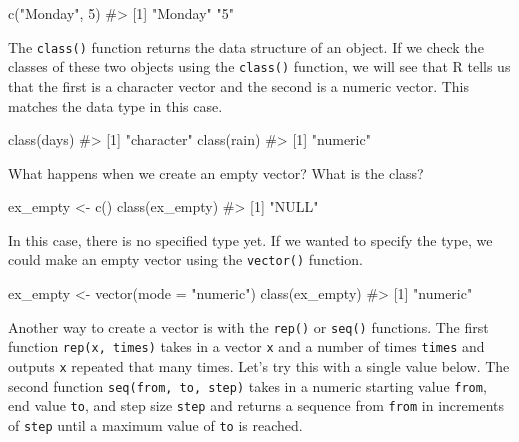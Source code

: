 \documentclass[
  letterpaper,
]{krantz}
\makeatletter
\newenvironment{Shaded}{\begin{snugshade}}{\end{snugshade}}
\newcommand{\AttributeTok}[1]{\textcolor[rgb]{0.40,0.45,0.13}{#1}}
\newcommand{\CommentTok}[1]{\textcolor[rgb]{0.37,0.37,0.37}{#1}}
\newcommand{\DecValTok}[1]{\textcolor[rgb]{0.68,0.00,0.00}{#1}}
\newcommand{\FunctionTok}[1]{\textcolor[rgb]{0.28,0.35,0.67}{#1}}
\newcommand{\NormalTok}[1]{\textcolor[rgb]{0.00,0.23,0.31}{#1}}
\newcommand{\OtherTok}[1]{\textcolor[rgb]{0.00,0.23,0.31}{#1}}
\newcommand{\StringTok}[1]{\textcolor[rgb]{0.13,0.47,0.30}{#1}}
\newenvironment{kframe}{%
\medskip{}
\setlength{\fboxsep}{.8em}
 \def\at@end@of@kframe{}%
 \ifinner\ifhmode%
  \def\at@end@of@kframe{\end{minipage}}%
  \begin{minipage}{\columnwidth}%
 \fi\fi%
 \def\FrameCommand##1{\hskip\@totalleftmargin \hskip-\fboxsep
 \colorbox{shadecolor}{##1}\hskip-\fboxsep
     \hskip-\linewidth \hskip-\@totalleftmargin \hskip\columnwidth}%
 \MakeFramed {\advance\hsize-\width
   \@totalleftmargin\z@ \linewidth\hsize
   \@setminipage}}%
 {\par\unskip\endMakeFramed%
 \at@end@of@kframe}
\renewenvironment{Shaded}{\begin{kframe}}{\end{kframe}}
\makeatother
\begin{document}
\begin{Shaded}
\begin{Highlighting}[]
\FunctionTok{c}\NormalTok{(}\StringTok{"Monday"}\NormalTok{, }\DecValTok{5}\NormalTok{)}
\CommentTok{\#\textgreater{} [1] "Monday" "5"}
\end{Highlighting}
\end{Shaded}

The \texttt{class()} function returns the data structure of an object.
If we check the classes of these two objects using the \texttt{class()}
function, we will see that R tells us that the first is a character
vector and the second is a numeric vector. This matches the data type in
this case.

\begin{Shaded}
\begin{Highlighting}[]
\FunctionTok{class}\NormalTok{(days)}
\CommentTok{\#\textgreater{} [1] "character"}
\FunctionTok{class}\NormalTok{(rain)}
\CommentTok{\#\textgreater{} [1] "numeric"}
\end{Highlighting}
\end{Shaded}

What happens when we create an empty vector? What is the class?

\begin{Shaded}
\begin{Highlighting}[]
\NormalTok{ex\_empty }\OtherTok{\textless{}{-}} \FunctionTok{c}\NormalTok{()}
\FunctionTok{class}\NormalTok{(ex\_empty)}
\CommentTok{\#\textgreater{} [1] "NULL"}
\end{Highlighting}
\end{Shaded}

In this case, there is no specified type yet. If we wanted to specify
the type, we could make an empty vector using the \texttt{vector()}
function.

\begin{Shaded}
\begin{Highlighting}[]
\NormalTok{ex\_empty }\OtherTok{\textless{}{-}} \FunctionTok{vector}\NormalTok{(}\AttributeTok{mode =} \StringTok{"numeric"}\NormalTok{)}
\FunctionTok{class}\NormalTok{(ex\_empty)}
\CommentTok{\#\textgreater{} [1] "numeric"}
\end{Highlighting}
\end{Shaded}

Another way to create a vector is with the \texttt{rep()} or
\texttt{seq()} functions. The first function \texttt{rep(x,\ times)}
takes in a vector \texttt{x} and a number of times \texttt{times} and
outputs \texttt{x} repeated that many times. Let's try this with a
single value below. The second function \texttt{seq(from,\ to,\ step)}
takes in a numeric starting value \texttt{from}, end value \texttt{to},
and step size \texttt{step} and returns a sequence from \texttt{from} in
increments of \texttt{step} until a maximum value of \texttt{to} is
reached.
\end{document}

